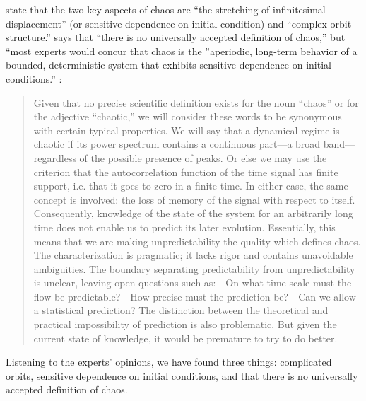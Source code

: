 \documentclass[10pt,twoside,draft]{book}
\begin{document}
\citet[p.31]{abarbanel,ott1994} state that the two key aspects of chaos are  %
``the stretching of infinitesimal displacement'' (or sensitive dependence on initial condition) and ``complex orbit structure.''
\citet[p.104]{sprott} says that ``there is no universally accepted definition of chaos,'' but ``most experts would concur that chaos is the ''aperiodic, long-term behavior of a bounded, deterministic system that exhibits sensitive dependence on initial conditions.''
\citet[p.103]{berge}:
\begin{quotation}
  Given that no precise scientific definition exists for the noun ``chaos'' or for the adjective ``chaotic,'' we will consider these words to be synonymous with certain typical properties.
  We will say that a dynamical regime is chaotic if its power spectrum contains a continuous part---a broad band---regardless of the possible presence of peaks.
  Or else we may use the criterion that the autocorrelation function of the time signal has finite support, i.e. that it goes to zero in a finite time.
  In either case, the same concept is involved: the loss of memory of the signal with respect to itself.
  Consequently, knowledge of the state of the system for an arbitrarily long time does not enable us to predict its later evolution.
  Essentially, this means that we are making unpredictability the quality which defines chaos.
  The characterization is pragmatic; it lacks rigor and contains unavoidable ambiguities.
  The boundary separating predictability from unpredictability is unclear, leaving open questions such as:
  - On what time scale must the flow be predictable?
  - How precise must the prediction be?
  - Can we allow a statistical prediction?
  The distinction between the theoretical and practical impossibility of prediction is also problematic.
  But given the current state of knowledge, it would be premature to try to do better.
\end{quotation}
Listening to the experts' opinions, we have found three things: complicated orbits, sensitive dependence on initial conditions, and that there is no universally accepted definition of chaos.
\end{document}
